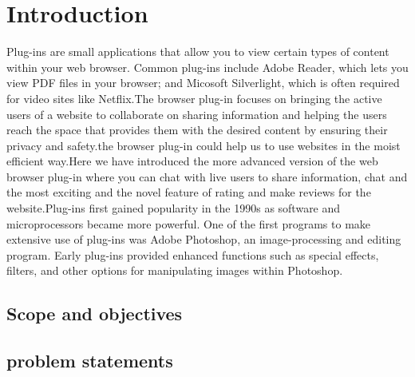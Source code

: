 \chapter{Introduction}
Plug-ins are small applications that allow you to view certain types of content within your web browser. Common plug-ins include Adobe Reader, which lets you view PDF files in your browser; and Micosoft Silverlight, which is often required for video sites like Netflix.The browser plug-in focuses on bringing the active users of a  website to collaborate on sharing information and helping the users reach the space that provides them with the desired content by ensuring their privacy and safety.the browser plug-in could help us to use websites in the moist efficient way.Here we have introduced the more advanced version of the web browser plug-in where you can chat with live users to share information, chat and the most exciting and the novel feature of rating and make reviews for the website.Plug-ins first gained popularity in the 1990s as software and microprocessors became more powerful. One of the first programs to make extensive use of plug-ins was Adobe Photoshop, an image-processing and editing program. Early plug-ins provided enhanced functions such as special effects, filters, and other options for manipulating images within Photoshop.


\section{Scope and objectives}

\section{problem statements} 
